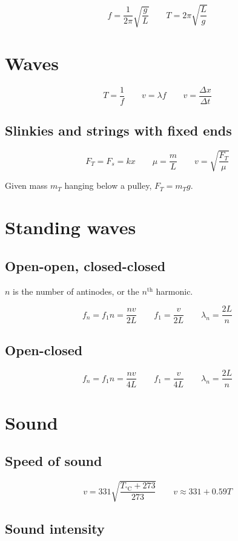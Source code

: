 \[
	f = \frac{1}{2\pi}\sqrt{\frac{g}{L}} \qquad 
	T = 2\pi \sqrt{\frac{L}{g}}
\]

\section{Waves}

\[
	T = \frac{1}{f} \qquad
	v = \lambda f \qquad
	v = \frac{\Delta x}{\Delta t}
\]

\subsection{Slinkies and strings with fixed ends}

\[
	F_T = F_s = kx \qquad
	\mu = \frac{m}{L} \qquad
	v = \sqrt{\frac{F_T}{\mu}}
\]

Given mass $m_T$ hanging below a pulley, $F_T = m_T g$.

\section{Standing waves}

\subsection{Open-open, closed-closed}

$n$ is the number of antinodes, or the $n^\text{th}$ harmonic.

\[
	f_n = f_1 n = \frac{nv}{2L} \qquad f_1 = \frac{v}{2L} \qquad \lambda_n = \frac{2L}{n}
\]

\subsection{Open-closed}

\[
	f_n = f_1 n = \frac{nv}{4L} \qquad f_1 = \frac{v}{4L} \qquad \lambda_n = \frac{2L}{n}
\]

\section{Sound}

\subsection{Speed of sound}

\[
	v = 331 \sqrt{\frac{T_{\text{°C}}+273}{273}} \qquad v \approx 331 + 0.59T
\]

\subsection{Sound intensity}

